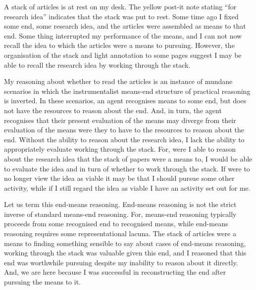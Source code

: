 \documentclass[10pt]{article}
\begin{document}
\newpage

A stack of articles is at rest on my desk.
The yellow post-it note stating ``for research idea'' indicates that the stack was put to rest.
Some time ago I fixed some end, some research idea, and the articles were assembled as means to that end.
Some thing interrupted my performance of the means, and I can not now recall the idea to which the articles were a means to pursuing.
However, the organisation of the stack and light annotation to some pages suggest I may be able to recall the research idea by working through the stack.

My reasoning about whether to read the articles is an instance of mundane scenarios in which the instrumentalist means-end structure of practical reasoning is inverted.
In these scenarios, an agent recognises means to some end, but does not have the resources to reason about the end.
And, in turn, the agent recognises that their present evaluation of the means may diverge from their evaluation of the means were they to have to the resources to reason about the end.
Without the ability to reason about the research idea, I lack the ability to appropriately evaluate working through the stack.
For, were I able to reason about the research idea that the stack of papers were a means to, I would be able to evaluate the idea and in turn of whether to work through the stack.
If were to no longer view the idea as viable it may be that I should pursue some other activity, while if I still regard the idea as viable I have an activity set out for me.

Let us term this end-means reasoning.
End-means reasoning is not the strict inverse of standard means-end reasoning.
For, means-end reasoning typically proceeds from some recognised end to recognised means, while end-means reasoning requires some representational lacuna.
The stack of articles were a means to finding something sensible to say about cases of end-means reasoning, working through the stack was valuable given this end, and I reasoned that this end was worthwhile pursuing despite my inability to reason about it directly.
And, we are here because I was successful in reconstructing the end after pursuing the means to it.
\end{document}
